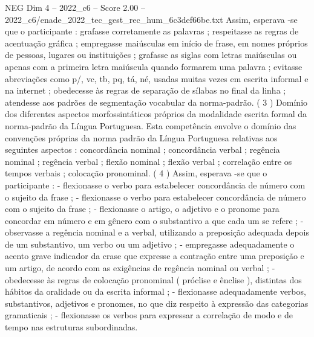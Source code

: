 \begin{textsample}{NEG Dim 4 – 2022\_c6 – Score 2.00 – 2022\_c6/enade\_2022\_tec\_gest\_rec\_hum\_6c3def66be.txt}
Assim, esperava -se que o participante : grafasse corretamente as palavras ; respeitasse as regras de acentuação gráfica ; empregasse maiúsculas em início de frase, em nomes próprios de pessoas, lugares ou instituições ; grafasse as siglas com letras maiúsculas ou apenas com a primeira letra maiúscula quando formarem uma palavra ; evitasse abreviações como p/, vc, tb, pq, tá, né, usadas muitas vezes em escrita informal e na internet ; obedecesse às regras de separação de sílabas no final da linha ; atendesse aos padrões de segmentação vocabular da norma-padrão. ( 3 ) Domínio dos diferentes aspectos morfossintáticos próprios da modalidade escrita formal da norma-padrão da Língua Portuguesa.
Esta competência envolve o domínio das convenções próprias da norma padrão da Língua Portuguesa relativas aos seguintes aspectos : concordância nominal ; concordância verbal ; regência nominal ; regência verbal ; flexão nominal ; flexão verbal ; correlação entre os tempos verbais ; colocação pronominal. ( 4 ) Assim, esperava -se que o participante : - flexionasse o verbo para estabelecer concordância de número com o sujeito da frase ; - flexionasse o verbo para estabelecer concordância de número com o sujeito da frase ; - flexionasse o artigo, o adjetivo e o pronome para concordar em número e em gênero com o substantivo a que cada um se refere ; - observasse a regência nominal e a verbal, utilizando a preposição adequada depois de um substantivo, um verbo ou um adjetivo ; - empregasse adequadamente o acento grave indicador da crase que expresse a contração entre uma preposição e um artigo, de acordo com as exigências de regência nominal ou verbal ; - obedecesse às regras de colocação pronominal ( próclise e ênclise ), distintas dos hábitos da oralidade ou da escrita informal ; - flexionasse adequadamente verbos, substantivos, adjetivos e pronomes, no que diz respeito à expressão das categorias gramaticais ; - flexionasse os verbos para expressar a correlação de modo e de tempo nas estruturas subordinadas.

\end{textsample}
